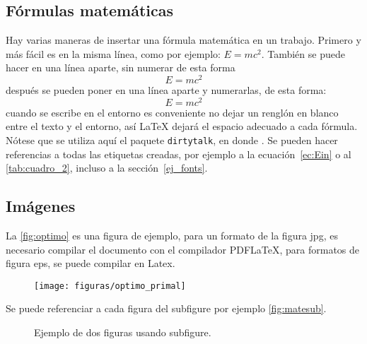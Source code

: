 \documentclass[a4paper,11pt]{article}
\begin{document}
\subsection{Fórmulas matemáticas}
Hay varias maneras de insertar una fórmula matemática en un trabajo. Primero y más fácil es en la misma línea, como por ejemplo: $E=mc^{2}$. También se puede hacer en una línea aparte, sin numerar de esta forma $$E=mc^{2}$$ después se pueden poner en una línea aparte y numerarlas, de esta forma: 
\begin{equation}\label{ec:Ein}
  E=mc^{2}
\end{equation} %
%
cuando se escribe en el entorno  es conveniente no dejar un renglón en blanco entre el texto y el entorno, así LaTeX dejará el espacio adecuado a cada fórmula. Nótese que se utiliza aquí el paquete \texttt{dirtytalk}, en donde . Se pueden hacer referencias a todas las etiquetas creadas, por ejemplo a la ecuación~\eqref{ec:Ein} o al \autoref{tab:cuadro_2}, incluso a la sección~\ref{ej_fonts}.


\subsection{Imágenes}
%
La \autoref{fig:optimo} es una figura de ejemplo, para un formato de la figura jpg, es necesario compilar el documento con el compilador PDFLaTeX, para formatos de figura eps, se puede compilar en Latex.
\begin{figure}[h!]
\centering
\texttt{[image: figuras/optimo\_primal]}
\label{fig:optimo}
\caption{}
\end{figure}


Se puede referenciar a cada figura del subfigure por ejemplo \autoref{fig:matesub}.\\

\begin{figure}[htb]
    \centering
    \hfil
    \caption{Ejemplo de dos figuras usando subfigure.}
\end{figure}
\end{document}
